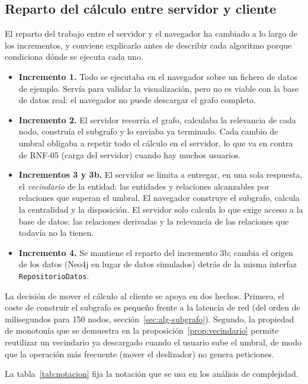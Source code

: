 \subsection{Reparto del cálculo entre servidor y cliente}
\label{sec:reparto}

El reparto del trabajo entre el servidor y el navegador ha cambiado a lo largo de los incrementos, y conviene explicarlo antes de describir cada algoritmo porque condiciona dónde se ejecuta cada uno.

\begin{itemize}
  \item \textbf{Incremento 1.} Todo se ejecutaba en el navegador sobre un fichero de datos de ejemplo. Servía para validar la visualización, pero no es viable con la base de datos real: el navegador no puede descargar el grafo completo.
  \item \textbf{Incremento 2.} El servidor recorría el grafo, calculaba la relevancia de cada nodo, construía el subgrafo y lo enviaba ya terminado. Cada cambio de umbral obligaba a repetir todo el cálculo en el servidor, lo que va en contra de RNF-05 (carga del servidor) cuando hay muchos usuarios.
  \item \textbf{Incrementos 3 y 3b.} El servidor se limita a entregar, en una sola respuesta, el \emph{vecindario} de la entidad: las entidades y relaciones alcanzables por relaciones que superan el umbral. El navegador construye el subgrafo, calcula la centralidad y la disposición. El servidor solo calcula lo que exige acceso a la base de datos: las relaciones derivadas y la relevancia de las relaciones que todavía no la tienen.
  \item \textbf{Incremento 4.} Se mantiene el reparto del incremento 3b; cambia el origen de los datos (Neo4j en lugar de datos simulados) detrás de la misma interfaz \texttt{RepositorioDatos}.
\end{itemize}

La decisión de mover el cálculo al cliente se apoya en dos hechos. Primero, el coste de construir el subgrafo es pequeño frente a la latencia de red (del orden de milisegundos para 150 nodos, sección~\ref{sec:alg-subgrafo}). Segundo, la propiedad de monotonía que se demuestra en la proposición~\ref{prop:vecindario} permite reutilizar un vecindario ya descargado cuando el usuario sube el umbral, de modo que la operación más frecuente (mover el deslizador) no genera peticiones.

La tabla~\ref{tab:notacion} fija la notación que se usa en los análisis de complejidad.

